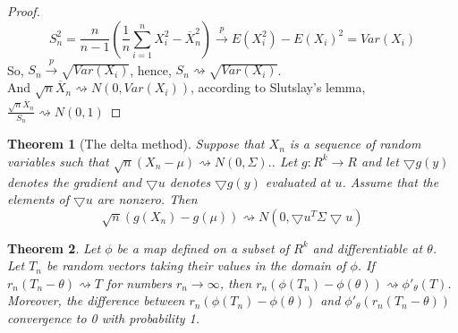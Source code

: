 \documentclass[11pt]{article}
\newtheorem{theorem}{Theorem}[section]
\begin{document}
\begin{proof}
$$
S_n^2 = \frac{n}{n-1}\left( \frac{1}{n}\sum_{i=1}^{n}X_i^2-\overline{X}_n^2\right) \xrightarrow{p} E(X_i^2)-E(X_i)^2 = Var(X_i)
$$
So, $S_n \xrightarrow{p} \sqrt{Var(X_i)}$, hence, $S_n \rightsquigarrow \sqrt{Var(X_i)}$.\\
And $\sqrt{n}\overline{X}_n \rightsquigarrow N(0,Var(X_i))$, according to Slutslay's lemma, $\frac{\sqrt{n}\overline{X}_n}{S_n} \rightsquigarrow N(0,1)$
\end{proof}
\begin{theorem}[The delta method]
Suppose that $X_n$ is a sequence of random variables such that $\sqrt{n}(X_n-\mu)\rightsquigarrow N(0,\Sigma).$. Let $g:R^k\rightarrow R$ and let $\bigtriangledown g(y)$ denotes the gradient and $\bigtriangledown u$ denotes $\bigtriangledown g(y)$ evaluated at $u$. Assume that the elements of $\bigtriangledown u$ are nonzero. Then
$$
\sqrt{n}(g(X_n)-g(\mu))\rightsquigarrow N(0, \bigtriangledown u^T\Sigma\bigtriangledown u)
$$
\end{theorem}
\begin{theorem}
Let $\phi$ be a map defined on a subset of $R^k$ and differentiable at $\theta$. Let $T_n$ be random vectors taking their values in the domain  of $\phi$. If $r_n(T_n-\theta)\rightsquigarrow T$ for numbers $r_n \rightarrow \infty$, then $r_n(\phi(T_n)-\phi(\theta))\rightsquigarrow \phi'_\theta(T)$. Moreover, the difference between $r_n(\phi(T_n)-\phi(\theta))$ and $\phi'_\theta(r_n(T_n-\theta))$ convergence to 0 with probability 1.
\end{theorem}
\end{document}

